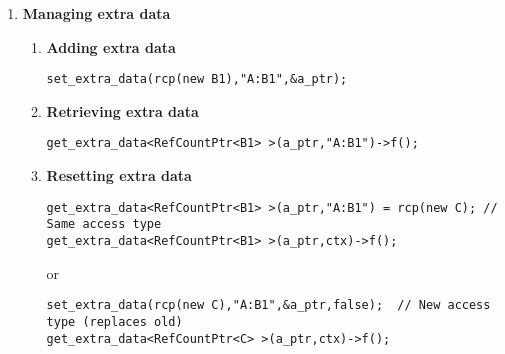 \begin{enumerate}
\item {\bf Managing extra data}
%
\begin{enumerate}
%
\item {\bf Adding extra data}
%
{\small\begin{verbatim}
set_extra_data(rcp(new B1),"A:B1",&a_ptr);
\end{verbatim}}
%
\item {\bf Retrieving extra data}
%
{\small\begin{verbatim}
get_extra_data<RefCountPtr<B1> >(a_ptr,"A:B1")->f();
\end{verbatim}}
%
\item {\bf Resetting extra data}
%
{\small\begin{verbatim}
get_extra_data<RefCountPtr<B1> >(a_ptr,"A:B1") = rcp(new C); // Same access type
get_extra_data<RefCountPtr<B1> >(a_ptr,ctx)->f();
\end{verbatim}}
or
{\small\begin{verbatim}
set_extra_data(rcp(new C),"A:B1",&a_ptr,false);  // New access type (replaces old)
get_extra_data<RefCountPtr<C> >(a_ptr,ctx)->f();
\end{verbatim}}
%
\end{enumerate}

\end{enumerate}
